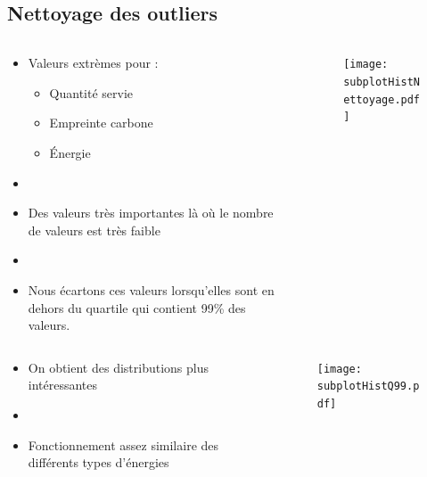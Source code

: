 \subsection{Nettoyage des outliers}
\begin{frame}{\insertsubsection}
  \begin{columns}
    \begin{column}{.3\textwidth}
      \begin{itemize}
        \item Valeurs extrèmes pour :
              \begin{itemize}
                \item Quantité servie
                \item Empreinte carbone
                \item Énergie
              \end{itemize}
        \item[]
        \item Des valeurs très importantes là où le nombre de valeurs est très faible
        \item[]
        \item Nous écartons ces valeurs lorsqu'elles sont en dehors du quartile qui contient 99\% des valeurs.
      \end{itemize}
    \end{column}
    \begin{column}{.7\textwidth}
      \begin{figure}
        \texttt{[image: subplotHistNettoyage.pdf]}
      \end{figure}
    \end{column}
  \end{columns}
\end{frame}

\begin{frame}{\insertsubsection}
  \begin{columns}
    \begin{column}{.3\textwidth}
      \begin{itemize}
        \item On obtient des distributions plus intéressantes
        \item[]
        \item Fonctionnement assez similaire des différents types d'énergies
      \end{itemize}
    \end{column}
    \begin{column}{.7\textwidth}
      \begin{figure}
        \texttt{[image: subplotHistQ99.pdf]}
      \end{figure}
    \end{column}
  \end{columns}
\end{frame}

